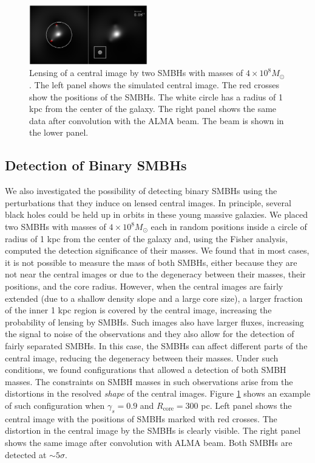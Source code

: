 \documentclass[chicago]{emulateapj}
\begin{document}
\begin{figure}
\begin{center}
\centering
\includegraphics[trim= 20 0 20 0, width=0.46\textwidth]{figures/f_05.eps}
\centering
\end{center}
\caption{ Lensing of a central image by two SMBHs with masses of $4\times 10^8M_{\odot}$. The left panel shows the simulated central image. The red crosses show the positions of the SMBHs. The white circle has a radius of 1 kpc  from the center of the galaxy. The right panel shows the same data after convolution with the ALMA beam. The beam is shown in the lower panel.
\label{fig:5}}
\end{figure}







\subsection{Detection of Binary SMBHs}
We also investigated the possibility of detecting binary SMBHs using the perturbations that they induce on lensed central images. 
In principle, several black holes could be held up in orbits in these young massive galaxies.
We placed two SMBHs with masses of $4\times10^8 M_{\odot}$ each in random positions inside a circle of radius of 1 kpc from the center of the galaxy and, using the Fisher analysis, computed the detection significance of their masses. 
We found that in most cases, it is not possible to measure the mass of both SMBHs, either because they are not near the central images or due to the degeneracy between their masses, their positions, and the core radius. 
However, when the central images are fairly extended (due to a shallow density slope and a large core size), a larger fraction of the inner 1 kpc region is covered by the central image, increasing the probability of lensing by SMBHs. Such images also have larger fluxes, increasing the signal to noise of the observations and they also allow for the detection of fairly separated SMBHs. In this case, the SMBHs can affect different parts of the central image, reducing the degeneracy between their masses.
Under such conditions, we found configurations that allowed a detection of both SMBH masses. The constraints on SMBH masses in such observations arise from the distortions in the resolved \emph{shape} of the central images. Figure \ref{fig:5} shows an example of such configuration when $\gamma_s = 0.9$ and $R_{\mathrm{core}}=300$ pc. Left panel shows the central image with the positions of SMBHs marked with red crosses. The distortion in the central image by the SMBHs is clearly visible. The right panel shows the same image after convolution with ALMA beam. Both SMBHs are detected at $\sim5\sigma$.
\end{document}
